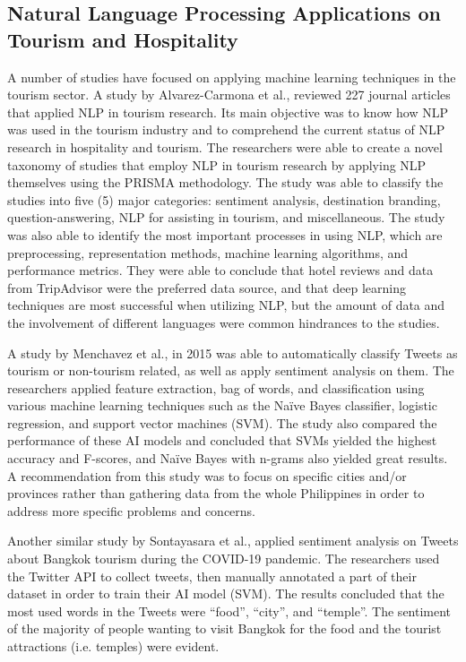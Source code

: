 \documentclass[journal]{./IEEE/IEEEtran}
\begin{document}
\subsection*{Natural Language Processing Applications on Tourism and Hospitality}

A number of studies have focused on applying machine learning techniques in the tourism sector. A study by Alvarez-Carmona et al.,\cite{six:alvarez} reviewed 227 journal articles that applied NLP in tourism research. Its main objective was to know how NLP was used in the tourism industry and to comprehend the current status of NLP research in hospitality and tourism. The researchers were able to create a novel taxonomy of studies that employ NLP in tourism research by applying NLP themselves using the PRISMA methodology. The study was able to classify the studies into five (5) major categories: sentiment analysis, destination branding, question-answering, NLP for assisting in tourism, and miscellaneous. The study was also able to identify the most important processes in using NLP, which are preprocessing, representation methods, machine learning algorithms, and performance metrics. They were able to conclude that hotel reviews and data from TripAdvisor were the preferred data source, and that deep learning techniques are most successful when utilizing NLP, but the amount of data and the involvement of different languages were common hindrances to the studies. 

A study by Menchavez et al., \cite{seven:menchavez} in 2015 was able to automatically classify Tweets as tourism or non-tourism related, as well as apply sentiment analysis on them. The researchers applied feature extraction, bag of words, and classification using various machine learning techniques such as the Naïve Bayes classifier, logistic regression, and support vector machines (SVM). The study also compared the performance of these AI models and concluded that SVMs yielded the highest accuracy and F-scores, and Naïve Bayes with n-grams also yielded great results. A recommendation from this study was to focus on specific cities and/or provinces rather than gathering data from the whole Philippines in order to address more specific problems and concerns. 

Another similar study by Sontayasara et al., \cite{eight:Sontayasara_2021jdr} applied sentiment analysis on Tweets about Bangkok tourism during the COVID-19 pandemic. The researchers used the Twitter API to collect tweets, then manually annotated a part of their dataset in order to train their AI model (SVM). The results concluded that the most used words in the Tweets were “food”, “city”, and “temple”. The sentiment of the majority of people wanting to visit Bangkok for the food and the tourist attractions (i.e. temples) were evident. 
\end{document}

